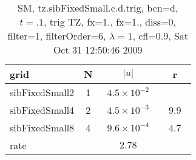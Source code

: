 \begin{table}[hbt]\tableFont %
\begin{center}
\begin{tabular}{|l|c|c|c|} \hline 
grid  & N &  $\vert u \vert$   & r \\ \hline 
      sibFixedSmall2 &     1 & ~$4.5\times10^{ -2}$~ &            \\ \hline
      sibFixedSmall4 &     2 & ~$4.5\times10^{ -3}$~ & ~$  9.9$~  \\ \hline
      sibFixedSmall8 &     4 & ~$9.6\times10^{ -4}$~ & ~$  4.7$~  \\ \hline
    rate             &       &       $2.78$         &        \\ \hline
\end{tabular}
\caption{SM, tz.sibFixedSmall.c.d.trig, bcn=d, $t=.1$, trig TZ, fx=1., fx=1., diss=0, filter=1, filterOrder=6, $\lambda=1$, cfl=0.9,  Sat Oct 31 12:50:46 2009}\label{table:tz.sibFixedSmall.c.d.trig}
\end{center}
\end{table}
